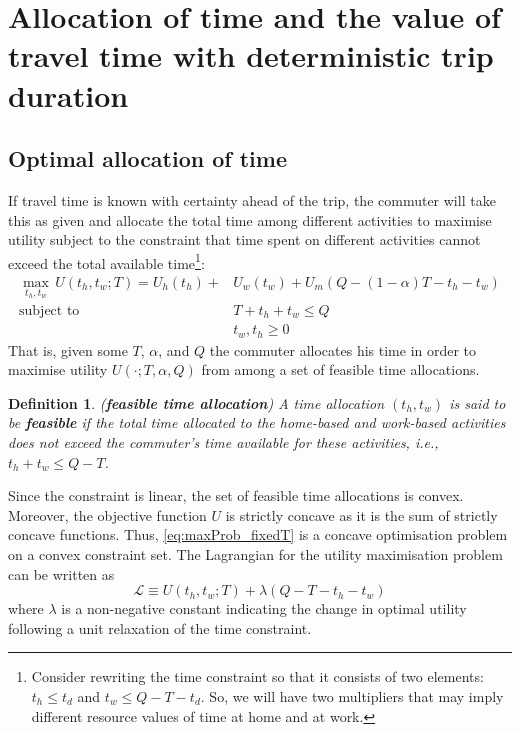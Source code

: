 \documentclass[12pt,a4paper,british]{article}
\newtheorem{definition}{Definition}[section]
\begin{document}
\section{Allocation of time and the value of travel time with deterministic trip duration}

\subsection*{Optimal allocation of time}

If travel time is known with certainty ahead of the trip, the commuter will take this as given and allocate the total time among different activities to maximise utility subject to the constraint that time spent on different activities cannot exceed the total available time\footnote{Consider rewriting the time constraint so that it consists of two elements: $t_h \leq t_d$ and $t_w \leq Q-T-t_d$. So, we will have two multipliers that may imply different resource values of time at home and at work.}:
\begin{equation}
\begin{aligned}
    \max_{t_{h},t_{w}} \, U\left(t_{h},t_{w};T\right) = U_{h} \left(t_{h}\right) + & U_{w}\left(t_{w}\right) + U_{m}\left( Q - \left(1-\alpha\right) T - t_{h} - t_{w} \right) \\
    \mbox{subject to} \quad & T + t_{h} + t_{w} \leq Q \\
                      \quad & t_w, t_h \geq 0 
\end{aligned}
\label{eq:maxProb_fixedT}
\end{equation}
That is, given some $T$, $\alpha$, and $Q$ the commuter allocates his time in order to maximise utility $U\left( \cdot; T, \alpha, Q \right)$ from among a set of feasible time allocations. 

\begin{definition}
(\textbf{feasible time allocation}) A time allocation $\left( t_h, t_w \right)$ is said to be \textbf{\textit{feasible}} if the total time allocated to the home-based and work-based activities does not exceed the commuter's time available for these activities, i.e., $t_h + t_w \leq Q - T$. 
\end{definition}

Since the constraint is linear, the set of feasible time allocations is convex. Moreover, the objective function $U$ is strictly concave as it is the sum of strictly concave functions. Thus, \eqref{eq:maxProb_fixedT} is a concave optimisation problem on a convex constraint set. The Lagrangian for the utility maximisation problem can be written as
\begin{equation*}
\mathcal{L} \equiv U\left(t_{h},t_{w};T\right) + \lambda \left(Q - T - t_{h} - t_{w}\right)
\end{equation*}%
where $\lambda$ is a non-negative constant indicating the change in optimal utility following a unit relaxation of the time constraint. 
\end{document}
